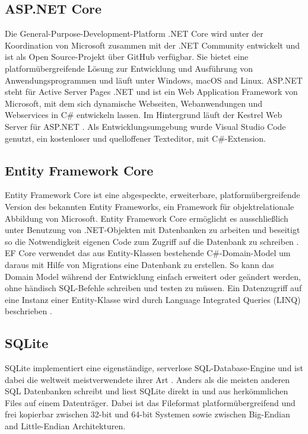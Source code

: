 \subsection{ASP.NET Core}

Die General-Purpose-Development-Platform .NET Core wird unter der Koordination von Microsoft zusammen mit der .NET Community entwickelt und ist als Open Source-Projekt über GitHub \cite{dotnetcore} verfügbar. Sie bietet eine platformübergreifende Lösung zur Entwicklung und Ausführung von Anwendungsprogrammen und läuft unter Windows, macOS and Linux. ASP.NET steht für Active Server Pages .NET und ist ein Web Application Framework von Microsoft, mit dem sich dynamische Webseiten, Webanwendungen und Webservices in C\# entwickeln lassen. Im Hintergrund läuft der Kestrel Web Server für ASP.NET \cite{kestrel}. Als Entwicklungsumgebung wurde Visual Studio Code genutzt, ein kostenloser und quelloffener Texteditor, mit C\#-Extension.


\subsection{Entity Framework Core}

Entity Framework Core ist eine abgespeckte, erweiterbare, platformübergreifende Version des bekannten Entity Frameworks, ein Framework für objektrelationale Abbildung von Microsoft. Entity Framework Core ermöglicht es ausschließlich unter Benutzung von .NET-Objekten mit Datenbanken zu arbeiten und beseitigt so die Notwendigkeit eigenen Code zum Zugriff auf die Datenbank zu schreiben \cite{msentitiyframework}. EF Core verwendet das aus Entity-Klassen bestehende C\#-Domain-Model um daraus mit Hilfe von Migrations eine Datenbank zu erstellen. So kann das Domain Model während der Entwicklung einfach erweitert oder geändert werden, ohne händisch SQL-Befehle schreiben und testen zu müssen. Ein Datenzugriff auf eine Instanz einer Entity-Klasse wird durch Language Integrated Queries (LINQ) beschrieben \cite{dotnetcore}.


\subsection{SQLite}

SQLite implementiert eine eigenständige, serverlose SQL-Database-Engine und ist dabei die weltweit meistverwendete ihrer Art \cite{sqlite}. Anders als die meisten anderen SQL Datenbanken schreibt und liest SQLite direkt in und aus herkömmlichen Files auf einem Datenträger. Dabei ist das Fileformat platformübergreifend und frei kopierbar zwischen 32-bit und 64-bit Systemen sowie zwischen Big-Endian and Little-Endian Architekturen.


